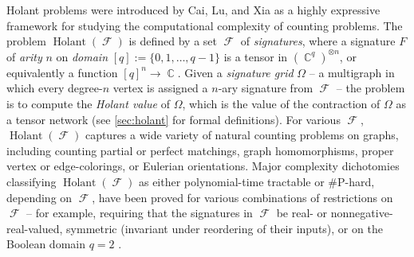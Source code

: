 \documentclass{article}
\DeclareMathOperator{\cc}{\mathbb{C}}
\DeclareMathOperator{\fc}{\mathcal{F}}
\DeclareMathOperator{\holant}{Holant}
\begin{document}
Holant problems were introduced by Cai, Lu, and Xia \cite{cai_computational_2011} as a highly
expressive framework for studying the computational complexity of counting problems. 
The problem $\holant(\fc)$ is defined by a set $\fc$ of \emph{signatures}, 
where a signature $F$ of \emph{arity}
$n$ on \emph{domain} $[q] := \{0,1,\ldots,q-1\}$ is a tensor in $(\cc^q)^{\otimes n}$, or equivalently
a function $[q]^n \to \cc$.
Given a \emph{signature grid} $\Omega$ -- a multigraph in which every degree-$n$ vertex is assigned a
$n$-ary signature from $\fc$ --
the problem is to compute the \emph{Holant value} of $\Omega$, which is the value
of the contraction of $\Omega$ as a tensor network (see \autoref{sec:holant} for formal definitions). 
For various $\fc$, $\holant(\fc)$ captures a wide variety of natural counting problems on
graphs, including counting partial or perfect matchings, graph homomorphisms, 
proper vertex or edge-colorings, or Eulerian orientations.
Major complexity dichotomies classifying $\holant(\fc)$ as either 
polynomial-time tractable or \#P-hard,
depending on $\fc$, have been proved for various combinations of restrictions on $\fc$ -- for example,
requiring that the signatures in $\fc$ be real- or nonnegative-real-valued, symmetric
(invariant under reordering of their inputs), or on the Boolean domain $q=2$
\cite{huang_2016_dichotomy,cai_complete_2016,cai2015holant,lin_complexity_2018,shao}.
\end{document}
